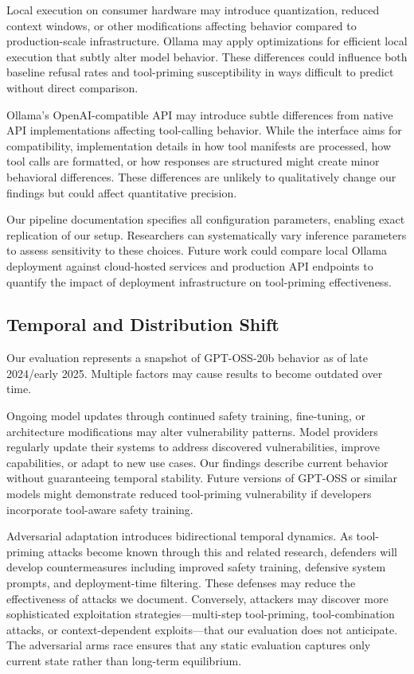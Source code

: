 \documentclass[compsoc,conference,a4paper,10pt,times]{IEEEtran}
\begin{document}
Local execution on consumer hardware may introduce quantization, reduced context windows, or other modifications affecting behavior compared to production-scale infrastructure. Ollama may apply optimizations for efficient local execution that subtly alter model behavior. These differences could influence both baseline refusal rates and tool-priming susceptibility in ways difficult to predict without direct comparison.

Ollama's OpenAI-compatible API may introduce subtle differences from native API implementations affecting tool-calling behavior. While the interface aims for compatibility, implementation details in how tool manifests are processed, how tool calls are formatted, or how responses are structured might create minor behavioral differences. These differences are unlikely to qualitatively change our findings but could affect quantitative precision.

Our pipeline documentation specifies all configuration parameters, enabling exact replication of our setup. Researchers can systematically vary inference parameters to assess sensitivity to these choices. Future work could compare local Ollama deployment against cloud-hosted services and production API endpoints to quantify the impact of deployment infrastructure on tool-priming effectiveness.

\subsection{Temporal and Distribution Shift}

Our evaluation represents a snapshot of GPT-OSS-20b behavior as of late 2024/early 2025. Multiple factors may cause results to become outdated over time.

Ongoing model updates through continued safety training, fine-tuning, or architecture modifications may alter vulnerability patterns. Model providers regularly update their systems to address discovered vulnerabilities, improve capabilities, or adapt to new use cases. Our findings describe current behavior without guaranteeing temporal stability. Future versions of GPT-OSS or similar models might demonstrate reduced tool-priming vulnerability if developers incorporate tool-aware safety training.

Adversarial adaptation introduces bidirectional temporal dynamics. As tool-priming attacks become known through this and related research, defenders will develop countermeasures including improved safety training, defensive system prompts, and deployment-time filtering. These defenses may reduce the effectiveness of attacks we document. Conversely, attackers may discover more sophisticated exploitation strategies—multi-step tool-priming, tool-combination attacks, or context-dependent exploits—that our evaluation does not anticipate. The adversarial arms race ensures that any static evaluation captures only current state rather than long-term equilibrium.
\end{document}
